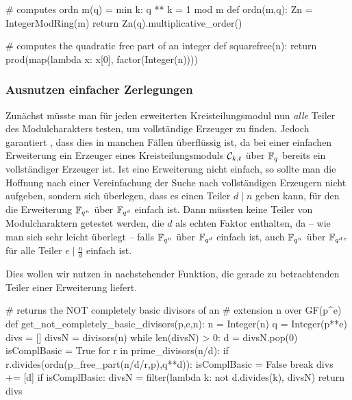 \begin{sagecode}[caption={Aus \url{../Sage/enumeratePCNs.spyx}}]
# computes ordn m(q) = min{ k: q ** k = 1 mod m }
def ordn(m,q):
    Zn = IntegerModRing(m)
    return Zn(q).multiplicative_order()
\end{sagecode}  

\begin{sagecode}[caption={Aus \url{../Sage/enumeratePCNs.spyx}}]
# computes the quadratic free part of an integer
def squarefree(n):
    return prod(map(lambda x: x[0], factor(Integer(n))))
\end{sagecode}  


\subsubsection{Ausnutzen einfacher Zerlegungen}

Zunächst müsste man für jeden erweiterten Kreisteilungsmodul
nun \emph{alle} Teiler des Modulcharakters testen, um vollständige Erzeuger zu
finden. Jedoch garantiert , dass dies in
manchen Fällen überflüssig ist, da bei einer einfachen Erweiterung ein Erzeuger
eines Kreisteilungsmoduls $\mathcal{C}_{k,t}$ über $\mathbb{F}_q$ bereits ein vollständiger
Erzeuger ist. Ist eine Erweiterung nicht einfach, so sollte man die Hoffnung
nach einer Vereinfachung der Suche nach vollständigen Erzeugern nicht aufgeben,
sondern sich überlegen, dass es einen Teiler $d \mid n$ geben kann, für den
die Erweiterung $\mathbb{F}_{q^n}$ über $\mathbb{F}_{q^d}$ einfach ist. Dann müssten keine
Teiler von Modulcharaktern getestet werden, die $d$ als echten Faktor
enthalten, da -- wie man sich sehr leicht überlegt -- 
falls $\mathbb{F}_{q^n}$ über $\mathbb{F}_{q^d}$ einfach
ist, auch $\mathbb{F}_{q^n}$ über $\mathbb{F}_{q^{d\,e}}$ für alle
Teiler $e \mid \tfrac n d$ einfach ist.

Dies wollen wir nutzen in nachstehender Funktion, die
gerade zu betrachtenden Teiler einer Erweiterung liefert.

\begin{sagecode}[caption={Aus \url{../Sage/enumeratePCNs.spyx}},
  label=lst:get_completely_basic_divisors]
# returns the NOT completely basic divisors of an 
# extension n over GF(p^e)
def get_not_completely_basic_divisors(p,e,n):
    n = Integer(n)
    q = Integer(p**e)
    divs = []
    divsN = divisors(n)
    while len(divsN) > 0:
        d = divsN.pop(0)
        isComplBasic = True
        for r in prime_divisors(n/d):
            if r.divides(ordn(p_free_part(n/d/r,p),q**d)):
                isComplBasic = False
                break
        divs += [d]
        if isComplBasic: 
            divsN = filter(lambda k: not d.divides(k), divsN)
    return divs
\end{sagecode}

